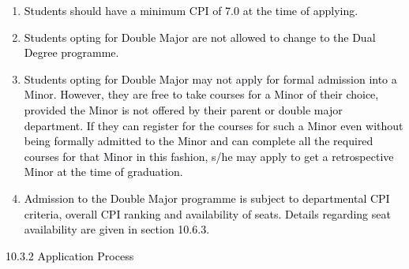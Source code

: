 \documentclass[12pt]{article}
\begin{document}
\vspace{\baselineskip}
\begin{enumerate}
	\item {\fontsize{10pt}{12.0pt}\selectfont \textcolor[HTML]{00000A}{Students should have a minimum CPI of 7.0 at the time of applying.}\par}\par


\vspace{\baselineskip}
	\item {\fontsize{10pt}{12.0pt}\selectfont \textcolor[HTML]{00000A}{Students opting for Double Major are not allowed to change to the Dual Degree programme.}\par}\par


\vspace{\baselineskip}
	\item {\fontsize{10pt}{12.0pt}\selectfont \textcolor[HTML]{00000A}{Students opting for Double Major may not apply for formal admission into a Minor. However, they are free to take courses for a Minor of their choice, provided the Minor is not offered by their parent or double major department. If they can register for the courses for such a Minor even without being formally admitted to the Minor and can complete all the required courses for that Minor in this fashion, s/he may apply to get a retrospective Minor at the time of graduation.}\par}\par


\vspace{\baselineskip}
	\item {\fontsize{10pt}{12.0pt}\selectfont \textcolor[HTML]{00000A}{Admission to the Double Major programme is subject to departmental CPI criteria, overall CPI ranking and availability of seats. Details regarding seat availability are given in section 10.6.3.}\par}
\end{enumerate}\par


\vspace{\baselineskip}
{\fontsize{10pt}{12.0pt}\selectfont \textcolor[HTML]{00000A}{10.3.2 Application Process}\par}\par
\end{document}
